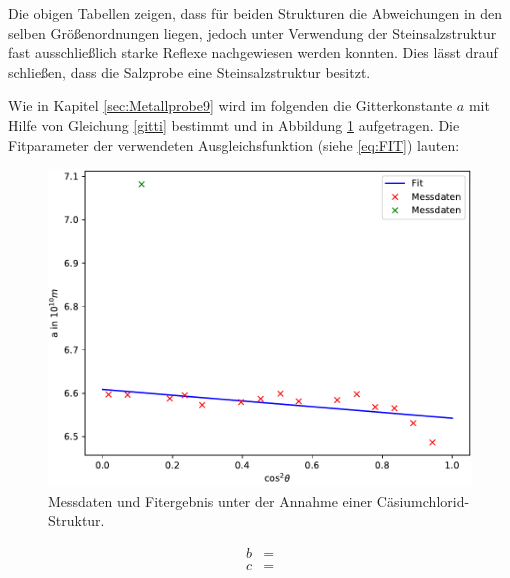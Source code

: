 % 





Die obigen Tabellen zeigen, dass für beiden Strukturen die Abweichungen in den selben Größenordnungen liegen, jedoch unter Verwendung der Steinsalzstruktur fast ausschließlich starke Reflexe nachgewiesen werden konnten. Dies lässt drauf schließen, dass die Salzprobe eine Steinsalzstruktur besitzt.


Wie in Kapitel \ref{sec:Metallprobe9} wird im folgenden die Gitterkonstante $a$ mit Hilfe von Gleichung \eqref{gitti} bestimmt und in Abbildung \ref{fig:SalzC} aufgetragen. Die Fitparameter der verwendeten Ausgleichsfunktion (siehe \ref{eq:FIT}) lauten:


\begin{figure}
  \centering
  \includegraphics[scale=0.75]{build/Salz_lasttry.pdf}
  \caption{Messdaten und Fitergebnis unter der Annahme einer Cäsiumchlorid-Struktur.}
  \label{fig:SalzC}
\end{figure}


\begin{align}
	b&=  \\
	c&= 
\end{align}


